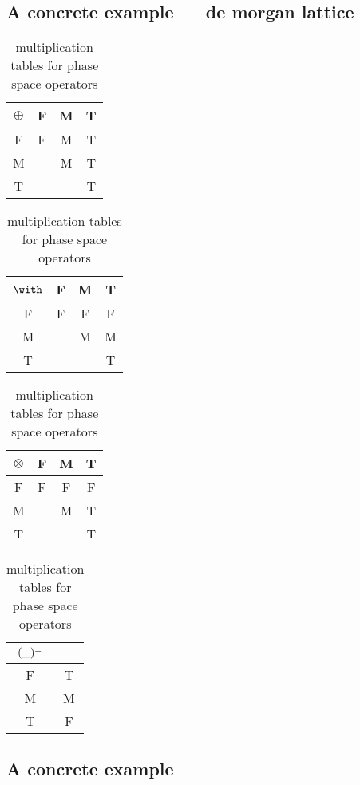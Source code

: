 
\subsection{A concrete example --- de morgan lattice}


\begin{table}[hbt]
\begin{center}
   \begin{tabular}{c|ccc}
  $\oplus$ & F &  M  & T \\ \hline
  F   &  F & M  & T   \\
  M  &     & M  & T   \\
  T   &     &     & T   \\
  \end{tabular}
%
\hskip 18pt\begin{tabular}{c|ccc}
  $\with$ & F  & M & T \\ \hline
        F   & F & F & F \\
        M   &   & M & M \\
        T   &   &     & T \\
  \end{tabular}
%
\hskip 18pt\begin{tabular}{c|ccc}
  $\otimes$ & F  & M & T \\ \hline
        F   & F & F & F \\
        M   &   & M & T \\
        T   &   &     & T \\
  \end{tabular}
%
\hskip 18pt
 \begin{tabular}{c|c}
 ${(\_)^{\bot}}$ &  \\ \hline
F & T \\
M & M \\
T & F \\
 \end{tabular}
\end{center}
\caption{multiplication tables for phase space operators}
\label{table:interpretation5}
\end{table}


\subsection{A concrete example}

\newcommand{\PSsetT}{\set{0,a,a^2,a^3,\PSidentity}}
\newcommand{\PSsetH}{\set{0,a,a^2,a^3}}
\newcommand{\PSsetM}{\set{0,a^2,a^3}}
\newcommand{\PSsetL}{\set{0,a^3}}
\newcommand{\PSsetF}{\set{0}}

